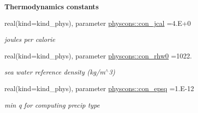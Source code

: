 \begin{Indent}{\bf Thermodynamics constants}
\begin{DoxyCompactItemize}
real(kind=kind\+\_\+phys), parameter \hyperlink{namespacephyscons_a28944c87d997bef79b77dc66847ff041}{physcons\+::con\+\_\+jcal} =4.\+E+0
\begin{DoxyCompactList}\small\item\em joules per calorie \end{DoxyCompactList}\item 
real(kind=kind\+\_\+phys), parameter \hyperlink{namespacephyscons_ae553a2a2cea3086dd27d8f88a56d66e1}{physcons\+::con\+\_\+rhw0} =1022.
\begin{DoxyCompactList}\small\item\em sea water reference density (kg/m$^\wedge$3) \end{DoxyCompactList}\item 
real(kind=kind\+\_\+phys), parameter \hyperlink{namespacephyscons_a990a4a07e2e5e963cac6fd0a9d5939ea}{physcons\+::con\+\_\+epsq} =1.\+E-\/12
\begin{DoxyCompactList}\small\item\em min q for computing precip type \end{DoxyCompactList}\end{DoxyCompactItemize}
\end{Indent}
